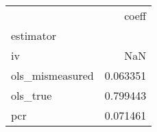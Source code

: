 \begin{tabular}{lr}
\toprule
{} &     coeff \\
estimator       &           \\
\midrule
iv              &       NaN \\
ols\_mismeasured &  0.063351 \\
ols\_true        &  0.799443 \\
pcr             &  0.071461 \\
\bottomrule
\end{tabular}
